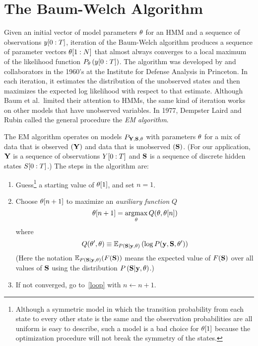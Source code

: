 \section{The Baum-Welch Algorithm}
\label{sec:baum_welch}

Given an initial vector of model parameters $\theta$ for an HMM
and a sequence of observations $y[0:T]$, iteration of the
Baum-Welch algorithm  produces a
sequence of parameter vectors $\theta[1:N]$ that almost
always converges to a local maximum of the likelihood function
$P_{\theta} \left( y[0:T] \right)$.  The algorithm was
developed by  and collaborators \cite{Baum70,Baum67} in
the 1960's at the Institute for Defense Analysis in Princeton.  In
each iteration, it estimates the distribution of the unobserved states
and then maximizes the expected log likelihood with respect to that
estimate.  Although Baum et al.\ limited their attention to HMMs, the
same kind of iteration works on other models that have unobserved
variables.  In 1977, Dempster Laird and Rubin \cite{Dempster77} called
the general procedure the \emph{EM algorithm}.  %
%

The EM algorithm operates on models $P_{{\bf Y},{\bf S},\theta} $ with
parameters $\theta$ for a mix of data that is observed $({\bf Y})$ and
data that is unobserved $({\bf S})$.  (For our application, ${\bf Y}$ is a
sequence of observations $Y[0:T]$ and ${\bf S}$ is a sequence of
discrete hidden states $S[0:T]$.)  The steps in the algorithm
are:
\begin{enumerate}
\item Guess\footnote{Although a symmetric model in which the
    transition probability from each state to every other state is the
    same and the observation probabilities are all uniform is easy to
    describe, such a model is a bad choice for ${\theta}{[1]}$
    because the optimization procedure will not break the symmetry of
    the states.}  a starting value of ${\theta}{[1]}$, and set
  $n=1$.
\item \label{EM_loop} Choose ${\theta}{[n+1]}$ to maximize
  an \emph{auxiliary function} $Q$
  \begin{equation}
    \label{eq:EMmax}
    {\theta}{[n+1]} = \operatorname*{argmax}_{\theta} Q(\theta,{\theta}{[n]})
  \end{equation}
  where
  \begin{equation}
    \label{eq:Qdef}
    Q(\theta',\theta) \equiv \mathbb{E}_{P \left({\bf S}|\mathbf{y},\theta \right)}
    \left( \log P(\mathbf{y},{\bf S},\theta') \right)
  \end{equation}
  (Here the notation $\mathbb{E}_{P \left({\bf S}|\mathbf{y},\theta
    \right)}(F({\bf S}))$ means the expected value of $F({\bf S})$ over all
  values of ${\bf S}$ using the distribution $P \left({\bf S}|\mathbf{y},\theta
  \right)$.)%
\item If not converged, go to~\ref{loop} with $n \leftarrow n+1.$
\end{enumerate}


